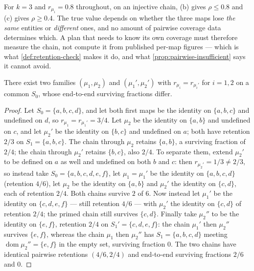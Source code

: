 \begin{remark}
\label{rem:bounds-gap}
For $k=3$ and $r_{\mu_i} = 0.8$ throughout, on an injective chain, (b) gives
$\rho \leq 0.8$ and (c) gives $\rho \geq 0.4$. The true value depends on
whether the three maps lose \emph{the same} entities or \emph{different} ones,
and no amount of pairwise coverage data determines which. A plan that needs to
know its own coverage must therefore measure the chain, not compute it from
published per-map figures --- which is what \cref{def:retention-check} makes it
do, and what \cref{prop:pairwise-insufficient} says it cannot avoid.
\end{remark}

\begin{proposition}
\label{prop:pairwise-insufficient}
There exist two families $(\mu_1,\mu_2)$ and $(\mu_1',\mu_2')$ with
$r_{\mu_i} = r_{\mu_i'}$ for $i=1,2$ on a common $S_0$, whose end-to-end
surviving fractions differ.
\end{proposition}

\begin{proof}
Let $S_0 = \{a,b,c,d\}$, and let both first maps be the identity on
$\{a,b,c\}$ and undefined on $d$, so $r_{\mu_1} = r_{\mu_1'} = 3/4$. Let
$\mu_2$ be the identity on $\{a,b\}$ and undefined on $c$, and let $\mu_2'$ be
the identity on $\{b,c\}$ and undefined on $a$; both have retention $2/3$ on
$S_1 = \{a,b,c\}$. The chain through $\mu_2$ retains $\{a,b\}$, a surviving
fraction of $2/4$; the chain through $\mu_2'$ retains $\{b,c\}$, also $2/4$. To
separate them, extend $\mu_2'$ to be defined on $a$ as well and undefined on
both $b$ and $c$: then $r_{\mu_2'} = 1/3 \neq 2/3$, so instead take
$S_0 = \{a,b,c,d,e,f\}$, let $\mu_1 = \mu_1'$ be the identity on
$\{a,b,c,d\}$ (retention $4/6$), let $\mu_2$ be the identity on $\{a,b\}$ and
$\mu_2'$ the identity on $\{c,d\}$, each of retention $2/4$. Both chains
survive $2$ of $6$. Now instead let $\mu_1'$ be the identity on
$\{c,d,e,f\}$ --- still retention $4/6$ --- with $\mu_2'$ the identity on
$\{c,d\}$ of retention $2/4$; the primed chain still survives $\{c,d\}$. Finally
take $\mu_2''$ to be the identity on $\{e,f\}$, retention $2/4$ on
$S_1' = \{c,d,e,f\}$: the chain $\mu_1'$ then $\mu_2''$ survives $\{e,f\}$,
whereas the chain $\mu_1$ then $\mu_2''$ has $S_1 = \{a,b,c,d\}$ meeting
$\operatorname{dom}\mu_2'' = \{e,f\}$ in the empty set, surviving fraction $0$.
The two chains have identical pairwise retentions $(4/6, 2/4)$ and end-to-end
surviving fractions $2/6$ and $0$.
\end{proof}

